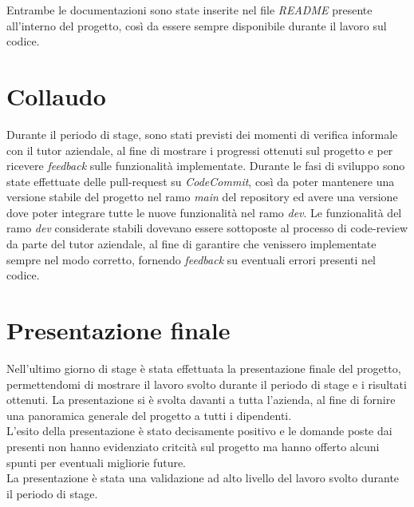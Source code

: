 Entrambe le documentazioni sono state inserite nel file \emph{README} presente
all'interno del progetto, così da essere sempre disponibile durante il lavoro
sul codice.

\section{Collaudo}

Durante il periodo di stage, sono stati previsti dei momenti di verifica
informale con il tutor aziendale, al fine di mostrare i progressi ottenuti sul
progetto e per ricevere \emph{feedback} sulle funzionalità implementate. Durante
le fasi di sviluppo sono state effettuate delle \glsfirstoccur\gls{pull-request}
su \emph{CodeCommit}, così da poter mantenere una versione stabile del progetto
nel ramo \emph{main} del repository ed avere una versione dove poter integrare
tutte le nuove funzionalità nel ramo \emph{dev}. Le funzionalità del ramo
\emph{dev} considerate stabili dovevano essere sottoposte al processo di
\glsfirstoccur\gls{code-review} da parte del tutor aziendale, al fine di
garantire che venissero implementate sempre nel modo corretto, fornendo
\emph{feedback} su eventuali errori presenti nel codice.

\section{Presentazione finale}

Nell'ultimo giorno di stage è stata effettuata la presentazione finale del
progetto, permettendomi di mostrare il lavoro svolto durante il periodo di stage
e i risultati ottenuti. La presentazione si è svolta davanti a tutta l'azienda,
al fine di fornire una panoramica generale del progetto a tutti i dipendenti. \\
L'esito della presentazione è stato decisamente positivo e le domande poste dai
presenti non hanno evidenziato critcità sul progetto ma hanno offerto alcuni
spunti per eventuali migliorie future.\\
La presentazione è stata una validazione ad alto livello del lavoro svolto
durante il periodo di stage.

